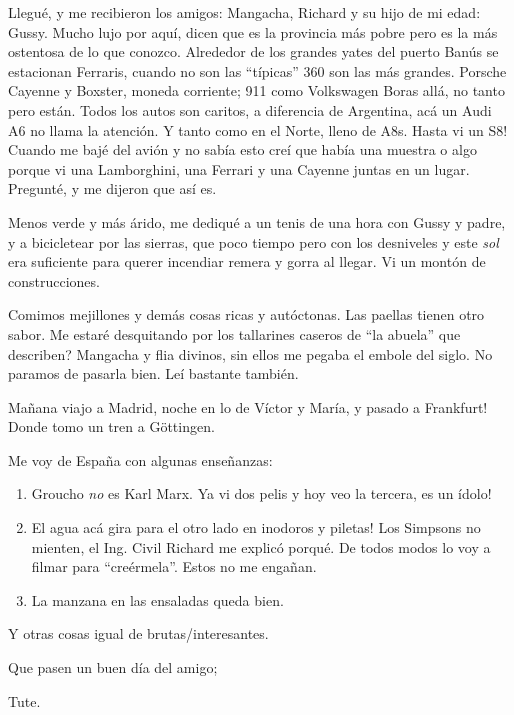 Llegu\'e, y me recibieron los amigos: Mangacha, Richard y su hijo de mi edad:
Gussy. Mucho lujo por aqu\'i, dicen que es la provincia m\'as pobre pero es la
m\'as ostentosa de lo que conozco. Alrededor de los grandes yates del puerto
Ban\'us se estacionan Ferraris, cuando no son las ``t\'ipicas'' 360 son las
m\'as grandes. Porsche Cayenne y Boxster, moneda corriente; 911 como
Volkswagen Boras all\'a, no tanto pero est\'an. Todos los autos son caritos, a
diferencia de Argentina, ac\'a un Audi A6 no llama la atenci\'on. Y tanto como
en el Norte, lleno de A8s. \textexclamdown Hasta vi un S8! Cuando me baj\'e
del avi\'on y no sab\'ia esto cre\'i que hab\'ia una muestra o algo porque vi
una Lamborghini, una Ferrari y una Cayenne juntas en un lugar. Pregunt\'e, y
me dijeron que as\'i es.

Menos verde y m\'as \'arido, me dediqu\'e a un tenis de una hora con Gussy y
padre, y a bicicletear por las sierras, que poco tiempo pero con los
desniveles y este \emph{sol} era suficiente para querer incendiar remera y
gorra al llegar. Vi un mont\'on de construcciones.

Comimos mejillones y dem\'as cosas ricas y aut\'octonas. Las paellas tienen
otro sabor. \textquestiondown Me estar\'e desquitando por los tallarines
caseros de ``la abuela'' que describen? Mangacha y flia divinos, sin ellos me
pegaba el embole del siglo. No paramos de pasarla bien. Le\'i bastante
tambi\'en.

Ma\~nana viajo a Madrid, noche en lo de V\'ictor y Mar\'ia, \textexclamdown y
pasado a Frankfurt! Donde tomo un tren a G\"ottingen.

Me voy de Espa\~na con algunas ense\~nanzas:

\begin{enumerate}
  \item{Groucho \emph{no} es Karl Marx. Ya vi dos pelis y hoy veo la tercera,
  \textexclamdown es un \'idolo!}
  \item{\textexclamdown El agua ac\'a gira para el otro lado en inodoros y
  piletas! Los Simpsons no mienten, el Ing. Civil Richard me explic\'o
  porqu\'e. De todos modos lo voy a filmar para ``cre\'ermela''. Estos no me
  enga\~nan.}
  \item{La manzana en las ensaladas queda bien.}
\end{enumerate}

Y otras cosas igual de brutas/interesantes.

Que pasen un buen d\'ia del amigo;

Tute.

